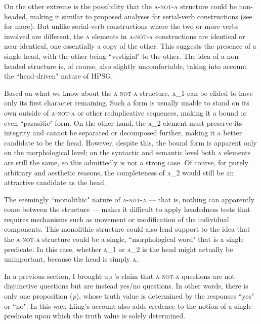 \documentclass[12pt, UTF8]{article}
\begin{document}
On the other extreme is the possibility that the \textsc{a-not-a} structure could be non-headed, making it similar to proposed analyses for serial-verb constructions (see \cite{Mueller2009} for more). But unlike serial-verb constructions where the two or more verbs involved are different, the \textsc{a} elements in \textsc{a-not-a} constructions are identical or near-identical, one essentially a copy of the other. This suggests the presence of a single head, with the other being ``vestigial" to the other. The idea of a non-headed structure is, of course, also slightly uncomfortable, taking into account the ``head-driven" nature of HPSG.


Based on what we know about the \textsc{a-not-a} structure, \textsc{a_1} can be elided to have only its first character remaining. Such a form is usually unable to stand on its own outside of \textsc{a-not-a} or other reduplicative sequences, making it a bound or even ``parasitic" form. On the other hand, the \textsc{a_2} element must preserve its integrity and cannot be separated or decomposed further, making it a better candidate to be the head. However, despite this, the bound form is apparent only on the morphological level; on the syntactic and semantic level both \textsc{a} elements are still the same, so this admittedly is not a strong case. Of course, for purely arbitrary and aesthetic reasons, the completeness of \textsc{a_2} would still be an attractive candidate as the head. 


The seemingly ``monolithic" nature of \textsc{a-not-a} --- that is, nothing can apparently come between the structure --- makes it difficult to apply headedness tests that requires mechanisms such as movement or modification of the individual components. This monolithic structure could also lend support to the idea that the \textsc{a-not-a} structure could be a single, ``morphological word" that is a single predicate. In this case, whether \textsc{a_1} or \textsc{a_2} is the head might actually be unimportant, because the head is simply \textsc{a}.

In a previous section, I brought up \cite{Liing2014}'s claim that \textsc{a-not-a} questions are not disjunctive questions but are instead yes/no questions. In other words, there is only one proposition (\textit{p}), whose truth value is determined by the responses ``yes" or ``no". In this way, Liing's account also adds credence to the notion of a single predicate upon which the truth value is solely determined.
\end{document}
